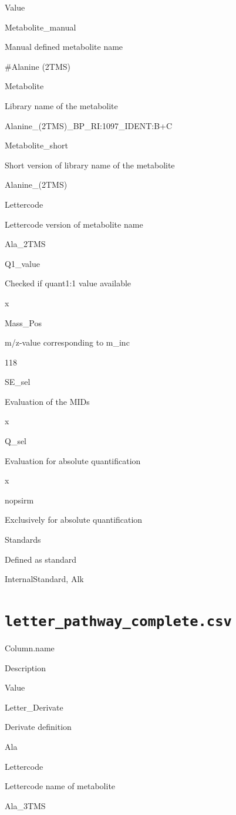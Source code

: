 \documentclass[]{book}
\theoremstyle{definition}
\theoremstyle{definition}
\theoremstyle{definition}
\theoremstyle{remark}
\begin{document}
Value

Metabolite\_manual

Manual defined metabolite name

\#Alanine (2TMS)

Metabolite

Library name of the metabolite

Alanine\_(2TMS)\_BP\_RI:1097\_IDENT:B+C

Metabolite\_short

Short version of library name of the metabolite

Alanine\_(2TMS)

Lettercode

Lettercode version of metabolite name

Ala\_2TMS

Q1\_value

Checked if quant1:1 value available

x

Mass\_Pos

m/z-value corresponding to m\_inc

118

SE\_sel

Evaluation of the MIDs

x

Q\_sel

Evaluation for absolute quantification

x

nopsirm

Exclusively for absolute quantification

Standards

Defined as standard

InternalStandard, Alk

\section{\texorpdfstring{\texttt{letter\_pathway\_complete.csv}}{letter\_pathway\_complete.csv}}\label{letter_pathway_complete.csv}

Column.name

Description

Value

Letter\_Derivate

Derivate definition

Ala

Lettercode

Lettercode name of metabolite

Ala\_3TMS
\end{document}
